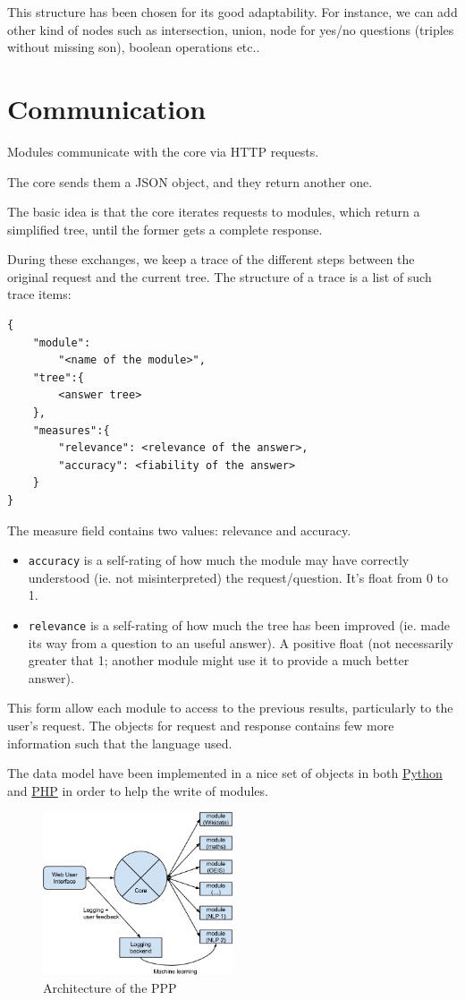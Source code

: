 This structure has been chosen for its good adaptability. For instance, we can add other kind of nodes such as intersection, union, node for yes/no questions (triples without missing son), boolean operations etc..

\section{Communication}

Modules communicate with the core via HTTP requests.

The core sends them a JSON object, and they return another one.

The basic idea is that the core iterates requests to modules, which return a simplified tree, until the former gets a complete response.

During these exchanges, we keep a trace of the different steps between the original request and the current tree. The structure of a trace is a list of such trace items:
\begin{verbatim}
{
    "module":
        "<name of the module>", 
    "tree":{
        <answer tree>
    },
    "measures":{
        "relevance": <relevance of the answer>,
        "accuracy": <fiability of the answer>
    }
}
\end{verbatim}

The measure field contains two values: relevance and accuracy.

\begin{itemize}
    \item \texttt{accuracy} is a self-rating of how much the module may have correctly understood (ie. not misinterpreted) the request/question. It's float from 0 to 1.
    \item \texttt{relevance} is a self-rating of how much the tree has been improved (ie. made its way from a question to an useful answer). A positive float (not necessarily greater that 1; another module might use it to provide a much better answer).
\end{itemize}

This form allow each module to access to the previous results, particularly to the user's request. The objects for request and response contains few more information such that the language used.

The data model have been implemented in a nice set of objects in both \href{http://github.com/ProjetPP/PPP-datamodel-Python}{Python} and \href{http://github.com/ProjetPP/PPP-datamodel-PHP}{PHP} in order to help the write of modules.

\begin{figure}
  \centering
    \label{struct}
    \caption{Architecture of the PPP}
    \includegraphics[width=0.5\textwidth]{../ppp_structure.png}
\end{figure}
